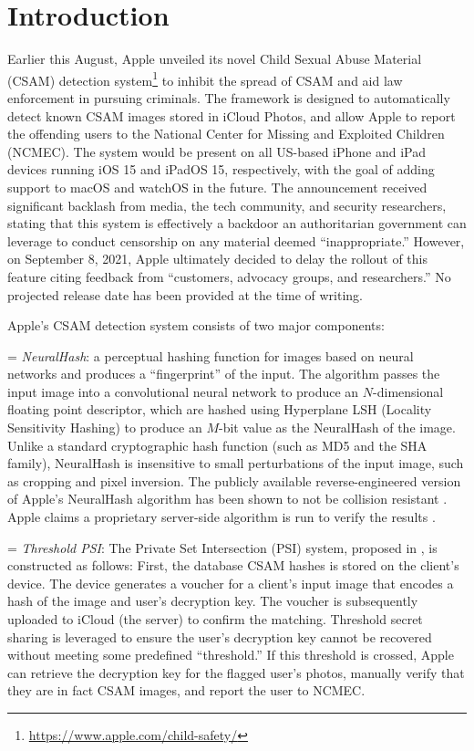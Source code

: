 
\section{Introduction} %
\label{sec:introduction}



Earlier this August, Apple unveiled its novel Child Sexual Abuse Material (CSAM) detection system\footnote{\url{https://www.apple.com/child-safety/}} to inhibit the spread of CSAM and aid law enforcement in pursuing criminals. The framework is designed to automatically detect known CSAM images stored in iCloud Photos, and allow Apple to report the offending users to the National Center for Missing and Exploited Children (NCMEC). The system would be present on all US-based iPhone and iPad devices running iOS 15 and iPadOS 15, respectively, with the goal of adding support to macOS and watchOS in the future. The announcement received significant backlash from media, the tech community, and security researchers, stating that this system is effectively a backdoor an authoritarian government can leverage to conduct censorship on any material deemed ``inappropriate.'' However, on September 8, 2021, Apple ultimately decided to delay the rollout of this feature citing feedback from ``customers, advocacy groups, and researchers.'' No projected release date has been provided at the time of writing.

Apple's CSAM detection system consists of two major components:

\noindent \hangindent=\parindent 
\emph{NeuralHash}: a perceptual hashing function for images based on neural networks and produces a ``fingerprint'' of the input. The algorithm passes the input image into a convolutional neural network to produce an $N$-dimensional floating point descriptor, which are hashed using Hyperplane LSH (Locality Sensitivity Hashing) to produce an $M$-bit value as the NeuralHash of the image. Unlike a standard cryptographic hash function (such as MD5 and the SHA family), NeuralHash is insensitive to small perturbations of the input image, such as cropping and pixel inversion. The publicly available reverse-engineered version of Apple's NeuralHash algorithm has been shown to not be collision resistant \cite{ygvarAppleNeuralHash2ONNX2021}. Apple claims a proprietary server-side algorithm is run to verify the results \cite{cox20201}.

\noindent 
\hangindent=\parindent 
\emph{Threshold PSI}: The Private Set Intersection (PSI) system, proposed in \cite{bhowmick2021apple}, is constructed as follows: First, the database CSAM hashes is stored on the client's device.  The device generates a voucher for a client's input image that encodes a hash of the image and user's decryption key. The voucher is subsequently uploaded to iCloud (the server) to confirm the matching. Threshold secret sharing is leveraged to ensure the user's decryption key cannot be recovered without meeting some predefined ``threshold.'' If this threshold is crossed, Apple can retrieve the decryption key for the flagged user's photos, manually verify that they are in fact CSAM images, and report the user to NCMEC. 




